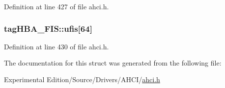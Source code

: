 Definition at line 427 of file ahci.\+h.

\subsubsection[{\texorpdfstring{ufis}{ufis}}]{ tag\+H\+B\+A\+\_\+\+F\+I\+S\+::ufis\mbox{[}64\mbox{]}}\hypertarget{structtagHBA__FIS_a878d317f7fcacf4f24e7dd38567ef0a4}{}\label{structtagHBA__FIS_a878d317f7fcacf4f24e7dd38567ef0a4}


Definition at line 430 of file ahci.\+h.



The documentation for this struct was generated from the following file\+:\begin{DoxyCompactItemize}
\item 
Experimental Edition/\+Source/\+Drivers/\+A\+H\+C\+I/\hyperlink{ahci_8h}{ahci.\+h}\end{DoxyCompactItemize}

